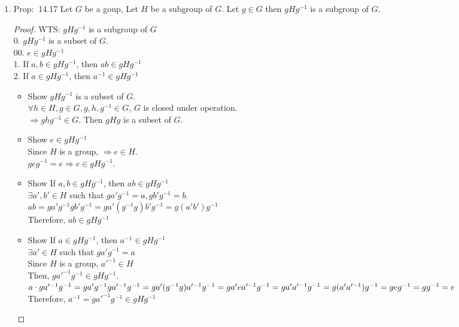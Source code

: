 \documentclass[12pt]{article}
\newcommand{\prop}{{\color{blue} Prop: $\ $}}
\begin{document}
\begin{enumerate}
\begin{enumerate}
        \item \prop 14.17 Let $G$ be a goup, Let $H$ be a subgroup of $G$. Let $g \in G$ then $gHg^{-1}$ is a subgroup of $G$.
        \begin{proof}
            WTS: $gHg^{-1}$ is a subgroup of $G$\\
            0. $gHg^{-1}$ is a subset of $G$.\\
            00. $e \in gHg^{-1}$\\
            1. If $a, b \in gHg^{-1}$, then $ab \in gHg^{-1}$\\
            2. If $a \in gHg^{-1}$, then $a^{-1} \in gHg^{-1}$
            \begin{itemize}
                \item Show $gHg^{-1}$ is a subset of $G$.\\
                $\forall h \in H, g \in G, g, h, g^{-1} \in G$, $G$ is closed under operation.\\
                $\Rightarrow ghg^{-1} \in G$. Then $gHg$ is a subset of $G$.
                \item Show $e \in gHg^{-1}$\\
                Since $H$ is a group, $\Rightarrow e \in H$.\\ $geg^{-1} = e \Rightarrow e \in gHg^{-1}$.
                \item Show If $a, b \in gHg^{-1}$, then $ab \in gHg^{-1}$\\
                $\exists a', b' \in H$ such that $ga'g^{-1} = a, gb'g^{-1} = b$.\\
                $ab = ga'g^{-1}gb'g^{-1} = ga'(g^{-1}g)b'g^{-1} = g(a'b')g^{-1}$\\
                Therefore, $ab \in gHg^{-1}$
                \item Show If $a \in gHg^{-1}$, then $a^{-1} \in gHg^{-1}$\\
                $\exists a' \in H$ such that $ga'g^{-1} = a$\\
                Since $H$ is a group, $a'^{-1} \in H$\\
                Then, $ga'^{-1}g^{-1} \in gHg^{-1}$.\\
                $a\cdot ga'^{-1}g^{-1} \\
                = ga'g^{-1}ga'^{-1}g^{-1} \\
                = ga'(g^{-1}g)a'^{-1}g^{-1} \\
                = ga'ea'^{-1}g^{-1} \\
                = ga'a'^{-1}g^{-1} \\
                = g(a'a'^{-1})g^{-1} \\
                = geg^{-1}  \\
                = gg^{-1} \\
                = e$\\
                Therefore, $a^{-1} = ga'^{-1}g^{-1} \in gHg^{-1}$
            \end{itemize}
            

\end{proof}
\end{enumerate}
\end{enumerate}
\end{document}

